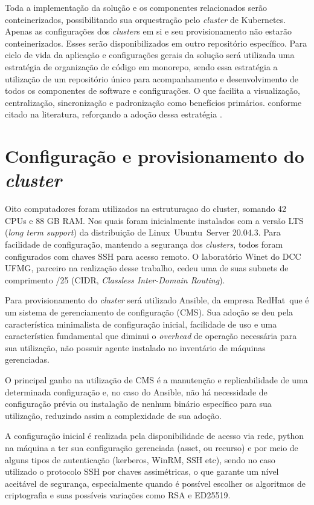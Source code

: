 Toda a implementação da solução e os componentes relacionados serão conteinerizados, possibilitando  sua orquestração pelo  \emph{cluster} de Kubernetes\textregistered. Apenas as configurações dos  \emph{cluster}s em si e seu provisionamento não estarão conteinerizados. Esses serão disponibilizados em outro repositório específico.
Para ciclo de vida da aplicação e configurações gerais da solução será utilizada uma estratégia de organização de código em monorepo, sendo essa estratégia a utilização de um repositório único para acompanhamento e desenvolvimento de todos os componentes de software e configurações. O que facilita a visualização, centralização, sincronização e padronização como benefícios primários. conforme citado na literatura, reforçando a adoção dessa estratégia \cite{brito_monorepos_2018}.


\section{Configuração e provisionamento do  \emph{cluster}}

Oito computadores foram utilizados na estruturaçao do cluster, somando 42 CPUs e 88 GB RAM. Nos quais foram inicialmente instalados com a versão LTS (\emph{long term support}) da distribuição de Linux\textregistered \ Ubuntu\textregistered \ Server {20.04.3}. Para facilidade de configuração, mantendo a segurança dos \emph{clusters}, todos foram configurados com chaves SSH para acesso remoto. O laboratório Winet do DCC UFMG, parceiro na realização desse trabalho, cedeu uma de suas subnets de comprimento /25 (CIDR, \emph{Classless Inter-Domain Routing}).

Para provisionamento do \emph{cluster} será utilizado Ansible\textregistered, da empresa RedHat\textregistered \ que é  um sistema de gerenciamento de configuração (CMS). Sua adoção se deu pela característica minimalista de configuração inicial, facilidade de uso e uma característica fundamental que diminui o \emph{overhead} de operação necessária para sua utilização, não possuir agente instalado no inventário de máquinas gerenciadas.

O principal ganho na utilização de CMS é a manutenção e replicabilidade de uma determinada configuração e, no caso do Ansible, não há necessidade de configuração prévia ou instalação de nenhum binário específico para sua utilização, reduzindo assim a complexidade de sua adoção.

A configuração inicial é realizada pela disponibilidade de acesso via rede, python na máquina a ter sua configuração gerenciada (asset, ou recurso) e por meio de alguns tipos de autenticação (kerberos, WinRM, SSH etc), sendo no caso utilizado o protocolo SSH \cite{noauthor_rfc4254_nodate} por chaves assimétricas, o que garante um nível aceitável de segurança, especialmente quando é possível escolher os algoritmos de criptografia e suas possíveis variações como RSA e ED25519.

